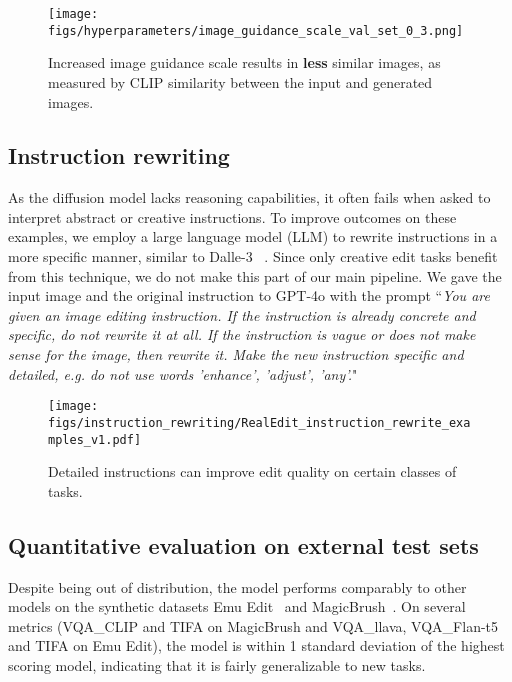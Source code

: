 \begin{figure}[h]
    \centering
    \texttt{[image: figs/hyperparameters/image\_guidance\_scale\_val\_set\_0\_3.png]}
    \caption{Increased image guidance scale results in \textbf{less} similar images, as measured by CLIP similarity between the input and generated images.}
    \label{fig:image_guidance_scale}
\end{figure}

\subsection{Instruction rewriting} 
As the diffusion model lacks reasoning capabilities, it often fails when asked to interpret abstract or creative instructions. To improve outcomes on these examples, we employ a large language model (LLM) to rewrite instructions in a more specific manner, similar to Dalle-3 ~\cite{betker2023dalle3}. Since only creative edit tasks benefit from this technique, we do not make this part of our main pipeline. We gave the input image and the original instruction to GPT-4o with the prompt ``\textit{You are given an image editing instruction. If the instruction is already concrete and specific, do not rewrite it at all. If the instruction is vague or does not make sense for the image, then rewrite it. Make the new instruction specific and detailed, e.g. do not use words 'enhance', 'adjust', 'any'.}"

\begin{figure*}[h]
    \centering
    \texttt{[image: figs/instruction\_rewriting/RealEdit\_instruction\_rewrite\_examples\_v1.pdf]}
    \caption{Detailed instructions can improve edit quality on certain classes of tasks.}
    \label{fig:instruction_rewrite}
\end{figure*}



\subsection{Quantitative evaluation on external test sets}



Despite being out of distribution, the \ours model performs comparably to other models on the synthetic datasets Emu Edit~\cite{sheynin2024emu} and MagicBrush~\cite{zhang2024magicbrush}. On several metrics (VQA\_CLIP and TIFA on MagicBrush and VQA\_llava, VQA\_Flan-t5 and TIFA on Emu Edit), the \ours model is within 1 standard deviation of the highest scoring model, indicating that it is fairly generalizable to new tasks. 

